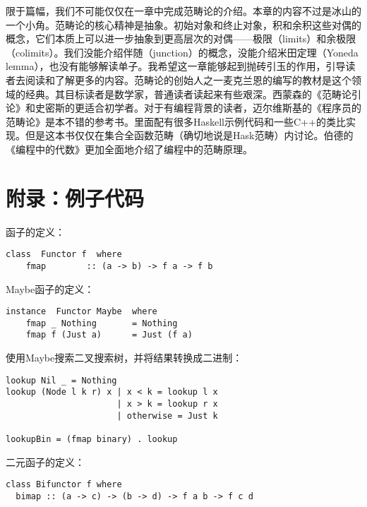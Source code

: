 \documentclass{article}
\begin{document}
限于篇幅，我们不可能仅仅在一章中完成范畴论的介绍。本章的内容不过是冰山的一个小角。范畴论的核心精神是抽象。初始对象和终止对象，积和余积这些对偶的概念，它们本质上可以进一步抽象到更高层次的对偶——极限（limits）和余极限（colimits）。我们没能介绍伴随（junction）的概念，没能介绍米田定理（Yoneda lemma），也没有能够解读单子。我希望这一章能够起到抛砖引玉的作用，引导读者去阅读和了解更多的内容。范畴论的创始人之一麦克兰恩的编写的教材\cite{Mac-Lane-1998}是这个领域的经典。其目标读者是数学家，普通读者读起来有些艰深。西蒙森的《范畴论引论》\cite{Simmons2011}和史密斯的\cite{PeterSmith2018}更适合初学者。对于有编程背景的读者，迈尔维斯基的《程序员的范畴论》\cite{Milewski2018}是本不错的参考书。里面配有很多Haskell示例代码和一些C++的类比实现。但是这本书仅仅在集合全函数范畴（确切地说是Hask范畴）内讨论。伯德的《编程中的代数》\cite{Bird97}更加全面地介绍了编程中的范畴原理。


\section{附录：例子代码}

函子的定义：

\lstset{frame=single}
\begin{lstlisting}[style=Haskell]
class  Functor f  where
    fmap        :: (a -> b) -> f a -> f b
\end{lstlisting}

Maybe函子的定义：

\begin{lstlisting}
instance  Functor Maybe  where
    fmap _ Nothing       = Nothing
    fmap f (Just a)      = Just (f a)
\end{lstlisting}

使用Maybe搜索二叉搜索树，并将结果转换成二进制：

\begin{lstlisting}[style=Haskell]
lookup Nil _ = Nothing
lookup (Node l k r) x | x < k = lookup l x
                      | x > k = lookup r x
                      | otherwise = Just k

lookupBin = (fmap binary) . lookup
\end{lstlisting}

二元函子的定义：

\begin{lstlisting}
class Bifunctor f where
  bimap :: (a -> c) -> (b -> d) -> f a b -> f c d
\end{lstlisting}
\end{document}
